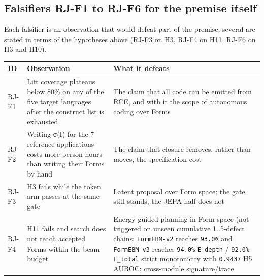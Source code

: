\documentclass[10pt,letterpaper]{article}
\begin{document}
\subsection{Falsifiers RJ-F1 to RJ-F6 for the premise
itself}\label{falsifiers-rj-f1-to-rj-f6-for-the-premise-itself}

Each falsifier is an observation that would defeat part of the premise;
several are stated in terms of the hypotheses above (RJ-F3 on H3, RJ-F4
on H11, RJ-F6 on H3 and H10).

{\footnotesize\setlength{\tabcolsep}{3.8pt}\renewcommand{\arraystretch}{1.15}
\begin{longtable}[]{@{}
  >{\raggedright\arraybackslash}p{}
  >{\raggedright\arraybackslash}p{}
  >{\raggedright\arraybackslash}p{}@{}}
\toprule\noalign{}
\begin{minipage}[b]{\linewidth}\raggedright
\textbf{ID}
\end{minipage} & \begin{minipage}[b]{\linewidth}\raggedright
\textbf{Observation}
\end{minipage} & \begin{minipage}[b]{\linewidth}\raggedright
\textbf{What it defeats}
\end{minipage} \\
\midrule\noalign{}
\endhead
\bottomrule\noalign{}
\endlastfoot
RJ-F1 & Lift coverage plateaus below 80\% on any of the five target
languages after the construct list is exhausted & The claim that all
code can be emitted from RCE, and with it the scope of autonomous coding
over Forms \\
RJ-F2 & Writing σ(I) for the 7 reference applications costs more
person-hours than writing their Forms by hand & The claim that closure
removes, rather than moves, the specification cost \\
RJ-F3 & H3 fails while the token arm passes at the same gate & Latent
proposal over Form space; the gate still stands, the JEPA half does
not \\
RJ-F4 & H11 fails and search does not reach accepted Forms within the
beam budget & Energy-guided planning in Form space (not triggered on
unseen cumulative 1..5-defect chains: \texttt{FormEBM-\allowbreak{}v2} reaches
\texttt{93.0\%} and \texttt{FormEBM-\allowbreak{}v3} reaches \texttt{94.0\%}
\texttt{E\_depth} / \texttt{92.0\%} \texttt{E\_total} strict
monotonicity with \texttt{0.9437} H5 AUROC; cross-module signature/trace

\end{longtable}}
\end{document}
